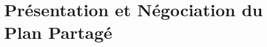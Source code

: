 \documentclass[a4paper,11pt,twoside]{StyleThese}
\begin{document}



\section{Présentation et Négociation du Plan Partagé}
\label{planPresentation}
\end{document}
